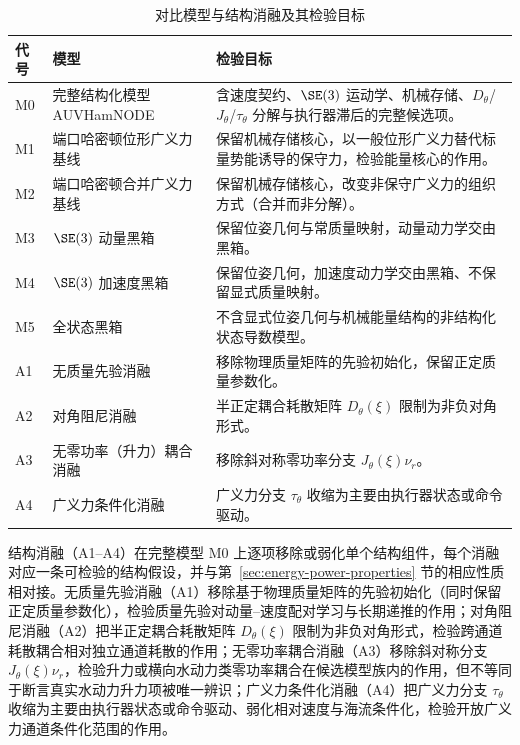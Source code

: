 \begin{table}[htbp]
  \centering
  \caption{对比模型与结构消融及其检验目标}
  \label{tab:model-comparison-roles}
  \begin{tabularx}{\textwidth}{l>{\raggedright\arraybackslash}p{}>{\raggedright\arraybackslash}X}
    \toprule
    代号 & 模型 & 检验目标 \\
    \midrule
    M0 & 完整结构化模型 AUVHamNODE & 含速度契约、\(\SE(3)\) 运动学、机械存储、\(D_\theta\)/\(J_\theta\)/\(\tau_\theta\) 分解与执行器滞后的完整候选项。 \\
    M1 & 端口哈密顿位形广义力基线 & 保留机械存储核心，以一般位形广义力替代标量势能诱导的保守力，检验能量核心的作用。 \\
    M2 & 端口哈密顿合并广义力基线 & 保留机械存储核心，改变非保守广义力的组织方式（合并而非分解）。 \\
    M3 & \(\SE(3)\) 动量黑箱 & 保留位姿几何与常质量映射，动量动力学交由黑箱。 \\
    M4 & \(\SE(3)\) 加速度黑箱 & 保留位姿几何，加速度动力学交由黑箱、不保留显式质量映射。 \\
    M5 & 全状态黑箱 & 不含显式位姿几何与机械能量结构的非结构化状态导数模型。 \\
    \midrule
    A1 & 无质量先验消融 & 移除物理质量矩阵的先验初始化，保留正定质量参数化。 \\
    A2 & 对角阻尼消融 & 半正定耦合耗散矩阵 \(D_\theta(\xi)\) 限制为非负对角形式。 \\
    A3 & 无零功率（升力）耦合消融 & 移除斜对称零功率分支 \(J_\theta(\xi)\nu_r\)。 \\
    A4 & 广义力条件化消融 & 广义力分支 \(\tau_\theta\) 收缩为主要由执行器状态或命令驱动。 \\
    \bottomrule
  \end{tabularx}
\end{table}

结构消融（A1--A4）在完整模型 M0 上逐项移除或弱化单个结构组件，每个消融对应一条可检验的结构假设，并与第~\ref{sec:energy-power-properties} 节的相应性质相对接。无质量先验消融（A1）移除基于物理质量矩阵的先验初始化（同时保留正定质量参数化），检验质量先验对动量--速度配对学习与长期递推的作用；对角阻尼消融（A2）把半正定耦合耗散矩阵 \(D_\theta(\xi)\) 限制为非负对角形式，检验跨通道耗散耦合相对独立通道耗散的作用；无零功率耦合消融（A3）移除斜对称分支 \(J_\theta(\xi)\nu_r\)，检验升力或横向水动力类零功率耦合在候选模型族内的作用，但不等同于断言真实水动力升力项被唯一辨识；广义力条件化消融（A4）把广义力分支 \(\tau_\theta\) 收缩为主要由执行器状态或命令驱动、弱化相对速度与海流条件化，检验开放广义力通道条件化范围的作用。

